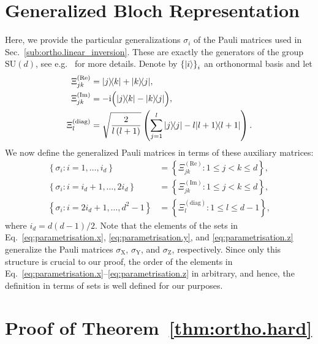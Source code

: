 \section{Generalized Bloch Representation}
\label{sec:error.parametrisation}

Here, we provide the particular generalizations $\sigma_{i}$ of the Pauli matrices used in Sec.~\ref{sub:ortho.linear_inversion}.
These are exactly the generators of the group $\mathrm{SU}(d)$, see e.g.~\cite{Kimura_2003_Bloch,Byrd_2003_Characterization} for more details.
Denote by  ${\{\ket{i}\}}_i$ an orthonormal basis and let
\begin{align*}
  \Xi_{jk}^{(\textrm{Re})} &=  \ket{j}\bra{k} + \ket{k}\bra{j}, \\
  \Xi_{jk}^{(\textrm{Im})} &= -\ii \Big(\ket{j}\bra{k} - \ket{k}\bra{j}\Big), \\
  \Xi_{l}^{(\textrm{diag})} &= \sqrt{\frac{2}{l\left(l+1\right)}}\left(\sum_{j=1}^{l} \ket{j}\bra{j} - l \ket{l+1}\bra{l+1} \right).
\end{align*}
We now define the generalized Pauli matrices in terms of these auxiliary matrices:
\begin{align}
  \label{eq:parametrisation.x}
  \left\{ \sigma_{i}:i=1,\ldots,i_{d}\right\} &= \left\{ \Xi_{jk}^{(\textrm{Re})}:1\leq j<k\leq d\right\},  \\
  \label{eq:parametrisation.y}
  \left\{ \sigma_{i}:i=i_{d}+1,\ldots,2i_{d}\right\} &= \left\{ \Xi_{jk}^{(\textrm{Im})}:1\leq j<k\leq d\right\}, \\
  \label{eq:parametrisation.z}
  \left\{ \sigma_{i}:i=2i_{d}+1,\ldots,d^{2}-1\right\} &= \left\{ \Xi_{l}^{(\textrm{diag})}:1\leq l\leq d-1\right\},
\end{align}
where $i_{d}=d(d-1)/2$.
Note that the elements of the sets in Eq.~\eqref{eq:parametrisation.x}, \eqref{eq:parametrisation.y}, and \eqref{eq:parametrisation.z} generalize the Pauli matrices $\sigma_\mathrm{X}$, $\sigma_\mathrm{Y}$, and $\sigma_\mathrm{Z}$, respectively.
Since only this structure is crucial to our proof, the order of the elements in Eq.~\eqref{eq:parametrisation.x}--\eqref{eq:parametrisation.z} in arbitrary, and hence, the definition in terms of sets is well defined for our purposes.

\section{Proof of Theorem~\ref{thm:ortho.hard}}
\label{sec:error.ellpos}

